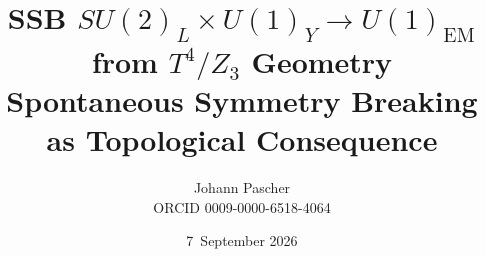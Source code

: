 \documentclass[11pt,a4paper]{report}
\title{SSB $SU(2)_L\times U(1)_Y\to U(1)_\text{EM}$ from $T^4/Z_3$ Geometry\\[0.5em]
  \large Spontaneous Symmetry Breaking as Topological Consequence}
\date{7~September 2026}
\author{Johann Pascher\\\small ORCID 0009-0000-6518-4064}
\begin{document}
\renewcommand{\thechapter}{}
\renewcommand{\thesection}{\arabic{section}}
\maketitle
\tableofcontents

\end{document}
